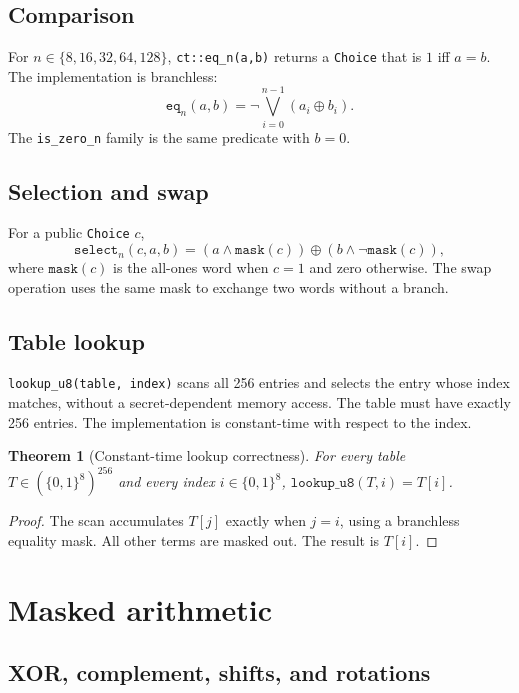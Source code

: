 \documentclass[11pt,a4paper]{article}
\newcommand{\bits}{\{0,1\}}
\newcommand{\code}[1]{\texttt{#1}}
\theoremstyle{plain}
\newtheorem{theorem}{Theorem}[section]
\theoremstyle{definition}
\theoremstyle{remark}
\begin{document}
\subsection{Comparison}

For \(n\in\{8,16,32,64,128\}\), \code{ct::eq\_n(a,b)} returns a \code{Choice} that is
\(1\) iff \(a=b\). The implementation is branchless:
\[
  \code{eq}_n(a,b) = \neg\bigvee_{i=0}^{n-1}(a_i\oplus b_i).
\]
The \code{is\_zero\_n} family is the same predicate with \(b=0\).

\subsection{Selection and swap}

For a public \code{Choice} \(c\),
\[
  \code{select}_n(c,a,b) = (a\wedge \code{mask}(c))\oplus(b\wedge\neg\code{mask}(c)),
\]
where \(\code{mask}(c)\) is the all-ones word when \(c=1\) and zero otherwise. The swap
operation uses the same mask to exchange two words without a branch.

\subsection{Table lookup}

\code{lookup\_u8(table, index)} scans all 256 entries and selects the entry whose index
matches, without a secret-dependent memory access. The table must have exactly 256
entries. The implementation is constant-time with respect to the index.

\begin{theorem}[Constant-time lookup correctness]\label{thm:lookup}
For every table \(T\in(\bits^8)^{256}\) and every index \(i\in\bits^8\),
\(\code{lookup\_u8}(T,i)=T[i]\).
\end{theorem}

\begin{proof}
The scan accumulates \(T[j]\) exactly when \(j=i\), using a branchless equality mask.
All other terms are masked out. The result is \(T[i]\).
\end{proof}

\section{Masked arithmetic}\label{sec:masked}

\subsection{XOR, complement, shifts, and rotations}
\end{document}
